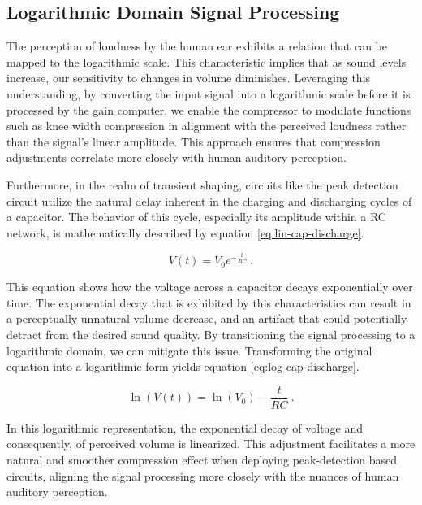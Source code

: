 \documentclass[10pt]{article}
\begin{document}
\begin{multicols*}{2}
            \subsection{Logarithmic Domain Signal Processing}
                The perception of loudness by the human ear exhibits a relation that can be mapped to the logarithmic scale. This characteristic implies that as sound levels increase, our sensitivity to changes in volume diminishes. Leveraging this understanding, by converting the input signal into a logarithmic scale before it is processed by the gain computer, we enable the compressor to modulate functions such as knee width compression in alignment with the perceived loudness rather than the signal's linear amplitude. This approach ensures that compression adjustments correlate more closely with human auditory perception.\par
                Furthermore, in the realm of transient shaping, circuits like the peak detection circuit utilize the natural delay inherent in the charging and discharging cycles of a capacitor. The behavior of this cycle, especially its amplitude within a RC network, is mathematically described by equation \ref{eq:lin-cap-discharge}.
                
                    \begin{equation}\label{eq:lin-cap-discharge}
                        V(t) = V_0 e^{-\frac{t}{RC}}\ .
                    \end{equation}    
                
                \noindent This equation shows how the voltage across a capacitor decays exponentially over time. The exponential decay that is exhibited by this characteristics can result in a perceptually unnatural volume decrease, and an artifact that could potentially detract from the desired sound quality. By transitioning the signal processing to a logarithmic domain, we can mitigate this issue. Transforming the original equation into a logarithmic form yields equation \ref{eq:log-cap-discharge}.
                
                    \begin{equation}\label{eq:log-cap-discharge}
                        \ln(V(t)) = \ln(V_0) - \frac{t}{RC}\ .
                    \end{equation}
                
                \noindent In this logarithmic representation, the exponential decay of voltage and consequently, of perceived volume is linearized. This adjustment facilitates a more natural and smoother compression effect when deploying peak-detection based circuits, aligning the signal processing more closely with the nuances of human auditory perception. 
                

\end{multicols*}
\end{document}

